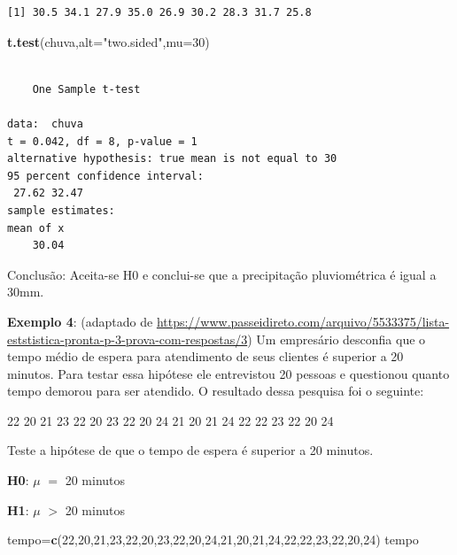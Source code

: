 \documentclass[12pt,portuguese,oneside]{book}
\newenvironment{Shaded}{\begin{snugshade}}{\end{snugshade}}
\newcommand{\KeywordTok}[1]{\textcolor[rgb]{0.13,0.29,0.53}{\textbf{#1}}}
\newcommand{\DataTypeTok}[1]{\textcolor[rgb]{0.13,0.29,0.53}{#1}}
\newcommand{\DecValTok}[1]{\textcolor[rgb]{0.00,0.00,0.81}{#1}}
\newcommand{\StringTok}[1]{\textcolor[rgb]{0.31,0.60,0.02}{#1}}
\newcommand{\NormalTok}[1]{#1}
\begin{document}
\begin{verbatim}
[1] 30.5 34.1 27.9 35.0 26.9 30.2 28.3 31.7 25.8
\end{verbatim}

\begin{Shaded}
\begin{Highlighting}[]
\KeywordTok{t.test}\NormalTok{(chuva,}\DataTypeTok{alt=}\StringTok{"two.sided"}\NormalTok{,}\DataTypeTok{mu=}\DecValTok{30}\NormalTok{)}
\end{Highlighting}
\end{Shaded}

\begin{verbatim}

    One Sample t-test

data:  chuva
t = 0.042, df = 8, p-value = 1
alternative hypothesis: true mean is not equal to 30
95 percent confidence interval:
 27.62 32.47
sample estimates:
mean of x 
    30.04 
\end{verbatim}

Conclusão: Aceita-se H0 e conclui-se que a precipitação pluviométrica é
igual a 30mm.

\textbf{Exemplo 4}: (adaptado de
\url{https://www.passeidireto.com/arquivo/5533375/lista-eststistica-pronta-p-3-prova-com-respostas/3})
Um empresário desconfia que o tempo médio de espera para atendimento de
seus clientes é superior a 20 minutos. Para testar essa hipótese ele
entrevistou 20 pessoas e questionou quanto tempo demorou para ser
atendido. O resultado dessa pesquisa foi o seguinte:

22 20 21 23 22 20 23 22 20 24 21 20 21 24 22 22 23 22 20 24

Teste a hipótese de que o tempo de espera é superior a 20 minutos.

\textbf{H0}: \(\mu\) \(=\) 20 minutos

\textbf{H1}: \(\mu\) \(>\) 20 minutos

\begin{Shaded}
\begin{Highlighting}[]
\NormalTok{tempo=}\KeywordTok{c}\NormalTok{(}\DecValTok{22}\NormalTok{,}\DecValTok{20}\NormalTok{,}\DecValTok{21}\NormalTok{,}\DecValTok{23}\NormalTok{,}\DecValTok{22}\NormalTok{,}\DecValTok{20}\NormalTok{,}\DecValTok{23}\NormalTok{,}\DecValTok{22}\NormalTok{,}\DecValTok{20}\NormalTok{,}\DecValTok{24}\NormalTok{,}\DecValTok{21}\NormalTok{,}\DecValTok{20}\NormalTok{,}\DecValTok{21}\NormalTok{,}\DecValTok{24}\NormalTok{,}\DecValTok{22}\NormalTok{,}\DecValTok{22}\NormalTok{,}\DecValTok{23}\NormalTok{,}\DecValTok{22}\NormalTok{,}\DecValTok{20}\NormalTok{,}\DecValTok{24}\NormalTok{)}
\NormalTok{tempo}
\end{Highlighting}
\end{Shaded}
\end{document}
